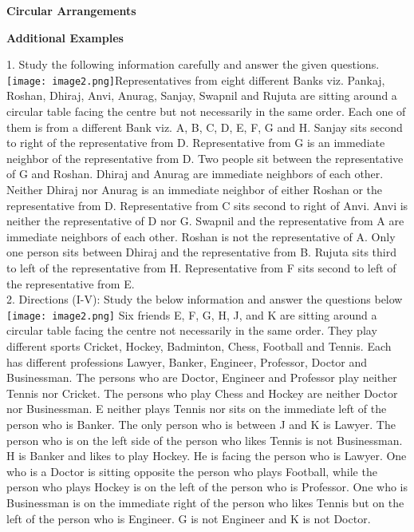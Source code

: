 \documentclass[
]{article}
\author{}
\date{}
\begin{document}
	
 

\begin{center}
	{\Large \textbf{Circular Arrangements \\}}
\end{center}

{\large \textbf{ Additional Examples \\}}


1. Study the following information carefully and answer the given questions.\\
\texttt{[image: image2.png]}Representatives from eight different Banks viz. Pankaj, Roshan, Dhiraj, Anvi, Anurag,
Sanjay, Swapnil and Rujuta are sitting around a circular table facing the centre but not
necessarily in the same order. Each one of them is from a different Bank viz. A, B, C, D, E, F,
G and H. Sanjay sits second to right of the representative from D. Representative from G is
an immediate neighbor of the representative from D. Two people sit between the
representative of G and Roshan. Dhiraj and Anurag are immediate neighbors of each other.
Neither Dhiraj nor Anurag is an immediate neighbor of either Roshan or the representative
from D. Representative from C sits second to right of Anvi. Anvi is neither the
representative of D nor G. Swapnil and the representative from A are immediate neighbors
of each other. Roshan is not the representative of A. Only one person sits between Dhiraj
and the representative from B. Rujuta sits third to left of the representative from H.
Representative from F sits second to left of the representative from E.\\

2. Directions (I-V): Study the below information and answer the questions below\\
\texttt{[image: image2.png]}
Six friends E, F, G, H, J, and K are sitting around a circular table facing the centre not
necessarily in the same order. They play different sports Cricket, Hockey, Badminton,
Chess, Football and Tennis. Each has different professions Lawyer, Banker, Engineer,
Professor, Doctor and Businessman. The persons who are Doctor, Engineer and Professor
play neither Tennis nor Cricket. The persons who play Chess and Hockey are neither Doctor
nor Businessman. E neither plays Tennis nor sits on the immediate left of the person who is
Banker. The only person who is between J and K is Lawyer. The person who is on the left
side of the person who likes Tennis is not Businessman. H is Banker and likes to play
Hockey. He is facing the person who is Lawyer. One who is a Doctor is sitting opposite the person who plays Football, while the person who plays Hockey is on the left of the person
who is Professor. One who is Businessman is on the immediate right of the person who likes
Tennis but on the left of the person who is Engineer. G is not Engineer and K is not Doctor.\\
\end{document}
